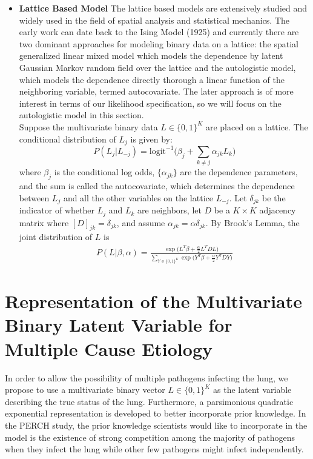 \documentclass[11 pt, a4paper]{article}  %
\begin{document}
\begin{itemize}
\item {\bf Lattice Based Model}
The lattice based models are extensively studied and widely used in the field of spatial analysis and statistical mechanics. The early work can date back to the Ising Model (1925) \cite{ising1925beitrag} and currently there are two dominant approaches for modeling binary data on a lattice: the spatial generalized linear mixed model which models the dependence by latent Gaussian Markov random field over the lattice \cite{banerjee2014hierarchical} and the autologistic model, which models the dependence directly \cite{besag1974spatial} thorough a linear function of the neighboring variable, termed autocovariate. The later approach is of more interest in terms of our likelihood specification, so we will focus on the autologistic model in this section.\\

Suppose the multivariate binary data $L\in \{0,1\}^K$ are placed on a lattice. The conditional distribution of $L_j$ is given by:
\[
P(L_j|L_{-j}) = \text{logit}^{-1} \Big ( \beta_j + \sum_{k\neq j} \alpha_{jk}L_k \Big )
\]
where $\beta_j$ is the conditional log odds, $\{\alpha_{jk}\}$ are the dependence parameters, and the sum is called the autocovariate, which determines the dependence between $L_j$ and all the other variables on the lattice $L_{-j}$. Let $\delta_{jk}$ be the indicator of whether $L_j$ and $L_k$ are neighbors, let $D$ be a $K\times K$ adjacency matrix where $[D]_{jk}=\delta_{jk}$, and assume $\alpha_{jk}=\alpha \delta_{jk}$. By Brook's Lemma, the joint distribution of $L$ is
\begin{align*}
P(L|\beta,\alpha) = \frac{\exp \big ( L^T\beta + \frac{\alpha}{2} L^T D L \big )}
{\sum_{Y\in \{0,1\}^K } \exp \big ( Y^T\beta + \frac{\alpha}{2} Y^T D Y \big )}
\end{align*} 

\end{itemize}



\newpage
\section{Representation of the Multivariate Binary Latent Variable for Multiple Cause Etiology}
In order to allow the possibility of multiple pathogens infecting the lung, we propose to use a multivariate binary vector $L\in \{0,1 \}^K$ as the latent variable describing the true status of the lung. Furthermore, a parsimonious quadratic exponential representation is developed to better incorporate prior knowledge. In the PERCH study, the prior knowledge scientists would like to incorporate in the model is the existence of strong competition among the majority of pathogens when they infect the lung while other few pathogens might infect independently. \\
\end{document}
